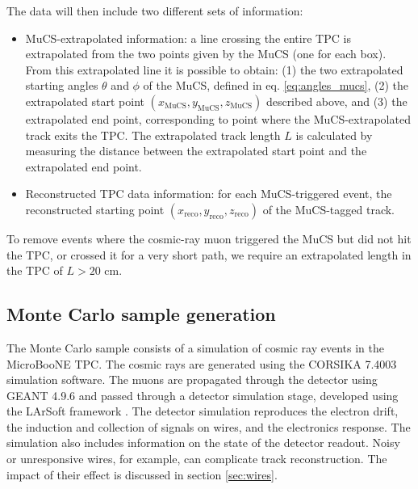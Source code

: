 \documentclass[a4paper,11pt]{article}
\begin{document}
The data will then include two different sets of information:
\begin{itemize}
  \item MuCS-extrapolated information: a line crossing the entire TPC is extrapolated from the two points given by the MuCS (one for each box). From this extrapolated line it is possible to obtain: (1) the two extrapolated starting angles $\theta$ and $\phi$ of the MuCS, defined in eq. \eqref{eq:angles_mucs}, (2) the extrapolated start point $(x_{\mathrm{MuCS}},y_{\mathrm{MuCS}},z_{\mathrm{MuCS}})$ described above, and (3) the extrapolated end point, corresponding to point where the MuCS-extrapolated track exits the TPC. The extrapolated track length $L$ is calculated by measuring the distance between the extrapolated start point and the extrapolated end point.
  \item Reconstructed TPC data information: for each MuCS-triggered event, the reconstructed starting point $(x_{\mathrm{reco}},y_{\mathrm{reco}},z_{\mathrm{reco}})$ of the MuCS-tagged track.
\end{itemize}
To remove events where the cosmic-ray muon triggered the MuCS but did not hit the TPC, or crossed it for a very short path, we require an extrapolated length in the TPC of $L > 20$ cm.

\subsection{Monte Carlo sample generation}\label{sec:mcgen}

The Monte Carlo sample consists of a simulation of cosmic ray events in the MicroBooNE TPC. The cosmic rays are generated using the CORSIKA 7.4003 \cite{corsika} simulation software. The muons are propagated through the detector using GEANT 4.9.6 \cite{geant} and passed through a detector simulation stage, developed using the LArSoft framework \cite{larsoft}. The detector simulation reproduces the electron drift, the induction and collection of signals on wires, and the electronics response. The simulation also includes information on the state of the detector readout. Noisy or unresponsive wires, for example, can complicate track reconstruction. The impact of their effect is discussed in section \ref{sec:wires}.
\end{document}
